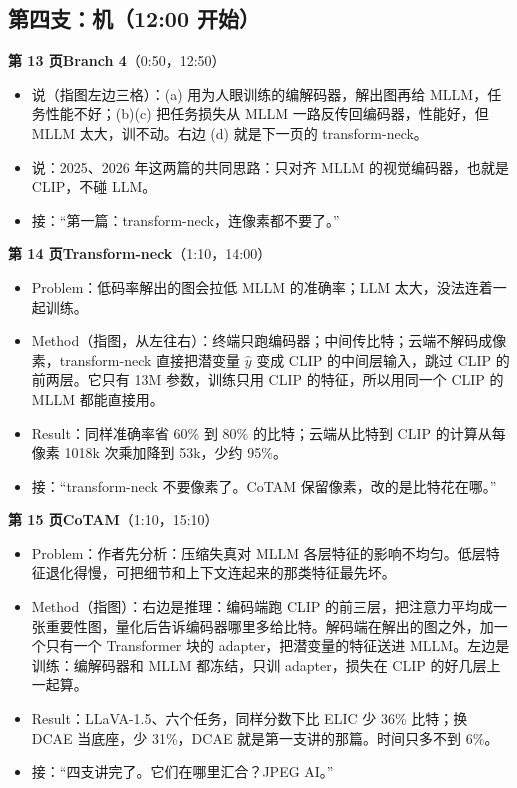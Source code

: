 \subsection*{\textcolor{hot}{第四支：机}（12:00 开始）}

\textbf{第 13 页\quad Branch 4}（0:50，12:50）
\begin{itemize}
  \item 说（指图左边三格）：(a) 用为人眼训练的编解码器，解出图再给 MLLM，任务性能不好；(b)(c) 把任务损失从 MLLM 一路反传回编码器，性能好，但 MLLM 太大，训不动。右边 (d) 就是下一页的 transform-neck。
  \item 说：2025、2026 年这两篇的共同思路：只对齐 MLLM 的视觉编码器，也就是 CLIP，不碰 LLM。
  \item 接：“第一篇：transform-neck，连像素都不要了。”
\end{itemize}

\textbf{第 14 页\quad Transform-neck}（1:10，14:00）
\begin{itemize}
  \item Problem：低码率解出的图会拉低 MLLM 的准确率；LLM 太大，没法连着一起训练。
  \item Method（指图，从左往右）：终端只跑编码器；中间传比特；云端不解码成像素，transform-neck 直接把潜变量 $\hat y$ 变成 CLIP 的中间层输入，跳过 CLIP 的前两层。它只有 13M 参数，训练只用 CLIP 的特征，所以用同一个 CLIP 的 MLLM 都能直接用。
  \item Result：同样准确率省 60\% 到 80\% 的比特；云端从比特到 CLIP 的计算从每像素 1018k 次乘加降到 53k，少约 95\%。
  \item 接：“transform-neck 不要像素了。CoTAM 保留像素，改的是比特花在哪。”
\end{itemize}

\textbf{第 15 页\quad CoTAM}（1:10，15:10）
\begin{itemize}
  \item Problem：作者先分析：压缩失真对 MLLM 各层特征的影响不均匀。低层特征退化得慢，可把细节和上下文连起来的那类特征最先坏。
  \item Method（指图）：右边是推理：编码端跑 CLIP 的前三层，把注意力平均成一张重要性图，量化后告诉编码器哪里多给比特。解码端在解出的图之外，加一个只有一个 Transformer 块的 adapter，把潜变量的特征送进 MLLM。左边是训练：编解码器和 MLLM 都冻结，只训 adapter，损失在 CLIP 的好几层上一起算。
  \item Result：LLaVA-1.5、六个任务，同样分数下比 ELIC 少 36\% 比特；换 DCAE 当底座，少 31\%，DCAE 就是第一支讲的那篇。时间只多不到 6\%。
  \item 接：“四支讲完了。它们在哪里汇合？JPEG AI。”
\end{itemize}

